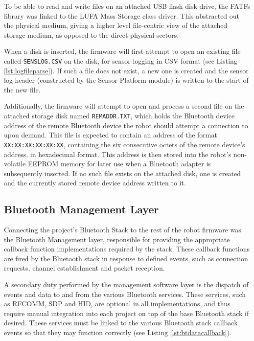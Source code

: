 To be able to read and write files on an attached USB flash disk drive, the FATFs library was linked to the LUFA Mass Storage class driver. This abstracted out the physical medium, giving a higher level file-centric view of the attached storage medium, as opposed to the direct physical sectors.

When a disk is inserted, the firmware will first attempt to open an existing file called \texttt{SENSLOG.CSV} on the disk, for sensor logging in CSV format (see Listing \ref{lst:logfileparse}). If such a file does not exist, a new one is created and the sensor log header (constructed by the Sensor Platform module) is written to the start of the new file.



Additionally, the firmware will attempt to open and process a second file on the attached storage disk named \texttt{REMADDR.TXT}, which holds the Bluetooth device address of the remote Bluetooth device the robot should attempt a connection to upon demand. This file is expected to contain an address of the format \texttt{XX:XX:XX:XX:XX:XX}, containing the six consecutive octets of the remote device's address, in hexadecimal format. This address is then stored into the robot's non-volatile EEPROM memory for later use when a Bluetooth adapter is subsequently inserted. If no such file exists on the attached disk, one is created and the currently stored remote device address written to it.

\FloatBarrier
\subsection{Bluetooth Management Layer}

Connecting the project's Bluetooth Stack to the rest of the robot firmware was the Bluetooth Management layer, responsible for providing the appropriate callback function implementations required by the stack. These callback functions are fired by the Bluetooth stack in response to defined events, such as connection requests, channel establishment and packet reception.

A secondary duty performed by the management software layer is the dispatch of events and data to and from the various Bluetooth services. These services, such as RFCOMM, SDP and HID, are optional in all implementations, and thus require manual integration into each project on top of the base Bluetooth stack if desired. These services must be linked to the various Bluetooth stack callback events so that they may function correctly (see Listing \ref{lst:btdatacallback}).

